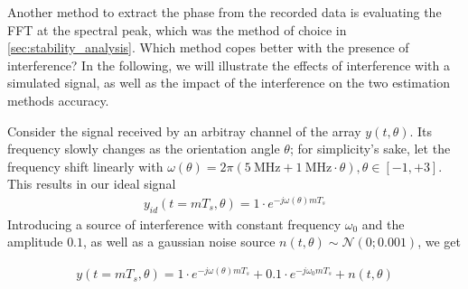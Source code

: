 Another method to extract the phase from the recorded data is evaluating the FFT at the spectral peak,
which was the method of choice in \ref{sec:stability_analysis}.
Which method copes better with the presence of interference?
In the following, we will illustrate the effects of interference with a simulated signal,
as well as the impact of the interference on the two estimation methods accuracy.

Consider the signal received by an arbitray channel of the array $y(t,\theta)$.
Its frequency slowly changes as the orientation angle $\theta$;
for simplicity's sake, let the frequency shift linearly with $\omega(\theta)=2\pi (\SI{5}{\MHz} + \SI{1}{\MHz} \cdot \theta), \theta \in [-1,+3]$.
This results in our ideal signal
\begin{align*}
    y_{id}(t=mT_s,\theta) = 1 \cdot e^{-j\omega(\theta)mT_s}
\end{align*}
Introducing a source of interference with constant frequency $\omega_0$ and the amplitude $0.1$,
as well as a gaussian noise source $n(t,\theta) \sim \mathcal{N}(0;0.001)$, we get

\begin{align*}
    y(t=mT_s,\theta) = 1 \cdot e^{-j\omega(\theta)mT_s} + 0.1 \cdot e^{-j\omega_0 mT_s} + n(t,\theta)
\end{align*}


